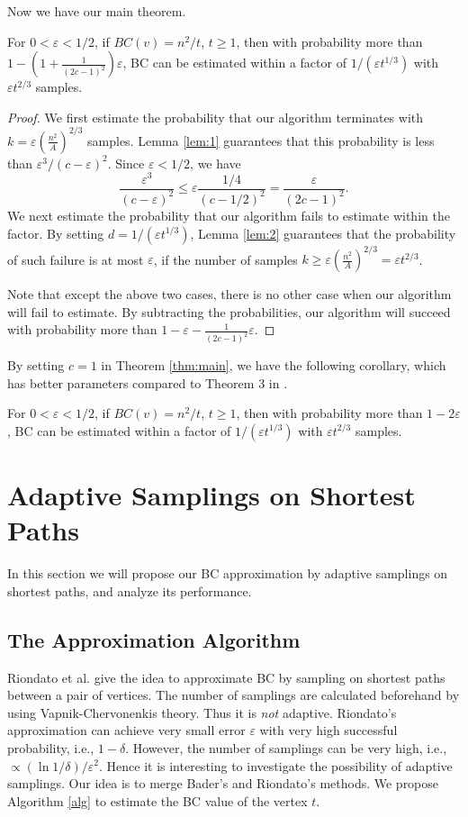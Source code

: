 \documentclass[10pt]{article}
\begin{document}
Now we have our main theorem.
\begin{theorem}
\label{thm:main}
For $0<\varepsilon < 1/2$, if $BC(v) = n^2/t$, $t\geq 1$, then with probability more than $1-\left(1+\frac{1}{(2c-1)^2}\right)\varepsilon$, BC can be estimated within a factor of $1/(\varepsilon t^{1/3})$ with $\varepsilon t^{2/3}$ samples.
\end{theorem}
\begin{proof}
We first estimate the probability that our algorithm terminates with $k=\varepsilon (\frac{n^2}{A})^{2/3}$ samples. Lemma \ref{lem:1} guarantees that this probability is less than $\varepsilon^3/(c-\varepsilon)^2$. Since $\varepsilon < 1/2$, we have
$$\frac{\varepsilon^3}{(c-\varepsilon)^2} \leq \varepsilon \frac{1/4}{(c-1/2)^2}=\frac{\varepsilon}{(2c-1)^2}.$$
We next estimate the probability that our algorithm fails to estimate within the factor. By setting $d=1/(\varepsilon t^{1/3})$, Lemma \ref{lem:2} guarantees that the probability of such failure is at most $\varepsilon$, if the number of samples $k\geq \varepsilon (\frac{n^2}{A})^{2/3}=\varepsilon t^{2/3}$.

Note that except the above two cases, there is no other case when our algorithm will fail to estimate. By subtracting the probabilities, our algorithm will succeed with probability more than $1-\varepsilon-\frac{1}{(2c-1)^2}\varepsilon$.
\end{proof}

By setting $c=1$ in Theorem \ref{thm:main}, we have the following corollary, which has better parameters compared to Theorem 3 in \cite{bader2007approximating}.
\begin{corollary}
For $0<\varepsilon < 1/2$, if $BC(v) =  n^2/t$, $t\geq 1$, then with probability more than $1-2\varepsilon$, BC can be estimated within a factor of $1/(\varepsilon t^{1/3})$ with $\varepsilon t^{2/3}$ samples.
\end{corollary}

\section{Adaptive Samplings on Shortest Paths}
In this section we will propose our BC approximation by adaptive samplings on shortest paths, and analyze its performance. 

\subsection{The Approximation Algorithm}
Riondato et al. \cite{riondato2014fast} give the idea to approximate BC by sampling on shortest paths between a pair of vertices. The number of samplings are calculated beforehand by using Vapnik-Chervonenkis theory. Thus it is {\it not} adaptive. Riondato's approximation can achieve very small error $\varepsilon$ with very high successful probability, i.e., $1-\delta$. However, the number of samplings can be very high, i.e., $\propto (\ln 1/\delta)/\varepsilon^2$. Hence it is interesting to investigate the possibility of adaptive samplings. Our idea is to merge Bader's \cite{bader2007approximating} and Riondato's \cite{riondato2014fast} methods. 
We propose Algorithm \ref{alg} to estimate the BC value of the vertex $t$.
\end{document}
